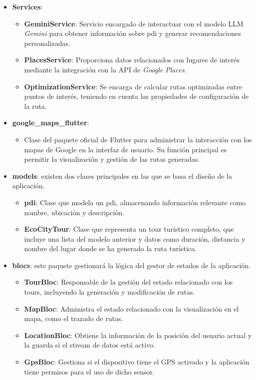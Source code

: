 \begin{itemize}
	\item \textbf{Services}:
	\begin{itemize}
		\item \textbf{GeminiService}: Servicio encargado de interactuar con el modelo LLM \textit{Gemini} para obtener información sobre \acrlong{pdi} y generar recomendaciones personalizadas.
		\item \textbf{PlacesService}: Proporciona datos relacionados con lugares de interés mediante la integración con la API de \textit{Google Places}.
		\item \textbf{OptimizationService}: Se encarga de calcular rutas optimizadas entre puntos de interés, teniendo en cuenta las propiedades de configuración de la ruta.
	\end{itemize}
	
\item \textbf{google\_maps\_flutter}:
\begin{itemize}
	\item Clase del paquete oficial de Flutter para administrar la interacción con los mapas de Google en la interfaz de usuario. Su función principal es permitir la visualización y gestión de las rutas generadas.
\end{itemize}

	
	\item \textbf{models}: existen dos clases principales en las que se basa el diseño de la aplicación.
	\begin{itemize}
		\item \textbf{\acrlong{pdi}}: Clase que modela un \acrshort{pdi}, almacenando información relevante como nombre, ubicación y descripción. 
		\item \textbf{EcoCityTour}: Clase que representa un tour turístico completo, que incluye una lista del modelo anterior y datos como duración, distancia y nombre del lugar donde se ha generado la ruta turística.
	\end{itemize}
	
	\item \textbf{blocs}: este paquete gestionará la lógica del gestor de estados de la aplicación.
	\begin{itemize}
		\item \textbf{TourBloc}: Responsable de la gestión del estado relacionado con los tours, incluyendo la generación y modificación de rutas.
		\item \textbf{MapBloc}: Administra el estado relacionado con la visualización en el mapa, como el trazado de rutas.
		\item \textbf{LocationBloc}: Obtiene la información de la posición del usuario actual y la guarda si el stream de datos está activo.
		\item \textbf{GpsBloc}: Gestiona si el dispositivo tiene el GPS activado y la aplicación tiene permisos para el uso de dicho sensor.
	\end{itemize}
	

\end{itemize}
